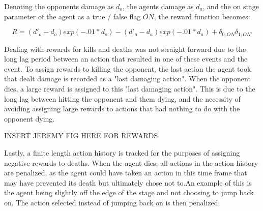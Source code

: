 Denoting the opponents damage as $d_o$, the agents damage as $d_a$, and the on stage parameter of the agent as a true / false flag $ON$, the reward function becomes:

$$R = (d'_o-d_o)exp(-.01*d_o) - (d'_a-d_a)exp(-.01*d_a) + \delta_{0,ON}\delta_{1,ON'}$$

Dealing with rewards for kills and deaths was not straight forward due to the long lag period between an action that resulted in one of these events and the event. To assign rewards to killing the opponent, the last action the agent took that dealt damage is recorded as a "last damaging action". When the opponent dies, a large reward is assigned to this "last damaging action". This is due to the long lag between hitting the opponent and them dying, and the necessity of avoiding assigning large rewards to actions that had nothing to do with the opponent dying. 

INSERT JEREMY FIG HERE FOR REWARDS

Lastly, a finite length action history is tracked for the purposes of assigning negative rewards to deaths. When the agent dies, all actions in the action history are penalized, as the agent could have taken an action in this time frame that may have prevented its death but ultimately chose not to.An example of this is the agent being slightly off the edge of the stage and not choosing to jump back on. The action selected instead of jumping back on is then penalized.


